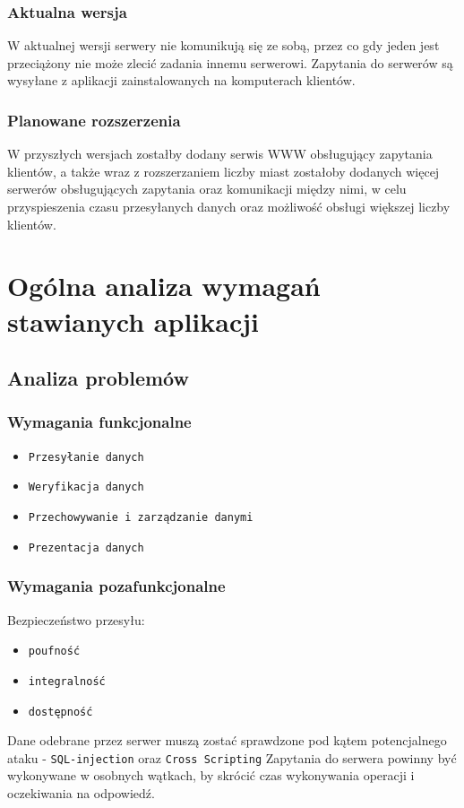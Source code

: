 \documentclass[pdftex,13pt,a4paper]{article}
\begin{document}
\subsubsection{Aktualna wersja}
W aktualnej wersji serwery nie komunikują się ze sobą, przez co gdy jeden jest przeciążony nie może zlecić zadania innemu serwerowi. Zapytania do serwerów są wysyłane z aplikacji zainstalowanych na komputerach klientów.

\subsubsection{Planowane rozszerzenia}
W przyszłych wersjach zostałby dodany serwis WWW obsługujący zapytania klientów, a także wraz z rozszerzaniem liczby miast zostałoby dodanych więcej serwerów obsługujących zapytania oraz komunikacji między nimi, w celu przyspieszenia czasu przesyłanych danych oraz możliwość obsługi większej liczby klientów.


\section{Ogólna analiza wymagań stawianych aplikacji}

\subsection{Analiza problemów}

\subsubsection{Wymagania funkcjonalne}

\begin{itemize}
\item \texttt{Przesyłanie danych}
\item \texttt{Weryfikacja danych}
\item \texttt{Przechowywanie i zarządzanie danymi}
\item \texttt{Prezentacja danych}
\end{itemize}

\subsubsection{Wymagania pozafunkcjonalne}

Bezpieczeństwo przesyłu:
\begin{itemize}
\item \texttt{poufność}
\item \texttt{integralność}
\item \texttt{dostępność}
\end{itemize}
Dane odebrane przez serwer muszą zostać sprawdzone pod kątem potencjalnego ataku - \texttt{SQL-injection} oraz \texttt{Cross Scripting}
\newline
\newline
Zapytania do serwera powinny być wykonywane w osobnych wątkach, by skrócić czas
wykonywania operacji i oczekiwania na odpowiedź.
\end{document}
